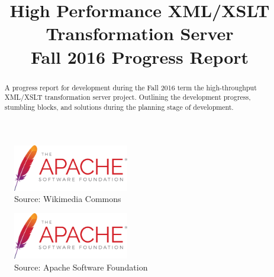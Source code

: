 

\title{
	High Performance XML/XSLT Transformation Server \\
    {
    	\LARGE Fall 2016 Progress Report 
    }
}
\author{
}



\maketitle
\begin{abstract}
  A progress report for development during the Fall 2016 term the high-throughput XML/XSLT transformation server project.
  Outlining the development progress, stumbling blocks, and solutions during the planning stage of development.
\end{abstract}

\begin{figure}[h]
  \begin{centering}
    \includegraphics[width=0.45\textwidth,bb=0 0 1080 438]{figures/osu-logo.PNG}
    \caption{Source: Wikimedia Commons \cite{osu-logo}}
  \end{centering}
\end{figure}

\begin{figure}[h]
  \begin{centering}
    \includegraphics[width=0.45\textwidth,bb=0 0 1080 438]{figures/asf-logo.PNG}
    \caption{Source: Apache Software Foundation \cite{asf-logo}}
  \end{centering}
\end{figure}

